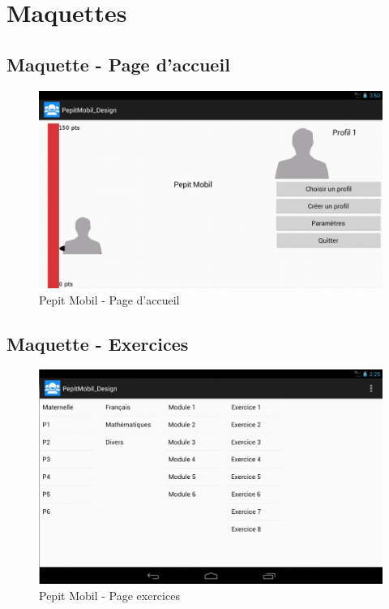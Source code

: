 \chapter{Maquettes}
\section*{Maquette - Page d'accueil}
\begin{figure}[H]
\begin{center}
\includegraphics[width=15cm]{images/maquettes_homePage}
\end{center}
\caption{Pepit Mobil - Page d'accueil}
\label{Pepit Mobil - Page d'accueil}
\end{figure}

\section*{Maquette - Exercices}
\begin{figure}[H]
\begin{center}
\includegraphics[width=15cm]{images/maquettes_exercices}
\end{center}
\caption{Pepit Mobil - Page exercices}
\label{Pepit Mobil - Page exercices}
\end{figure}


